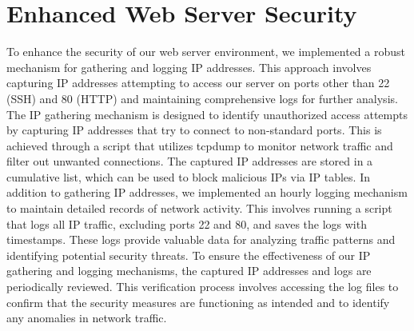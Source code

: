 \section{Enhanced Web Server Security}

To enhance the security of our web server environment, we implemented a robust mechanism for gathering and logging IP addresses. This approach involves capturing IP addresses attempting 
to access our server on ports other than 22 (SSH) and 80 (HTTP) and maintaining comprehensive logs for further analysis. The IP gathering mechanism is designed to identify unauthorized access 
attempts by capturing IP addresses that try to connect to non-standard ports. This is achieved through a script that utilizes tcpdump to monitor network traffic and filter out unwanted connections. 
The captured IP addresses are stored in a cumulative list, which can be used to block malicious IPs via IP tables. In addition to gathering IP addresses, we implemented an hourly logging mechanism to 
maintain detailed records of network activity. This involves running a script that logs all IP traffic, excluding ports 22 and 80, and saves the logs with timestamps. These logs provide valuable data 
for analyzing traffic patterns and identifying potential security threats. To ensure the effectiveness of our IP gathering and logging mechanisms, the captured IP addresses and logs are periodically 
reviewed. This verification process involves accessing the log files to confirm that the security measures are functioning as intended and to identify any anomalies in network traffic.
